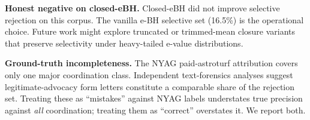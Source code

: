 \documentclass{article}
\theoremstyle{definition}
\theoremstyle{remark}
\begin{document}
\textbf{Honest negative on closed-eBH.} Closed-eBH did not improve selective rejection on this corpus. The vanilla e-BH selective set (16.5\%) is the operational choice. Future work might explore truncated or trimmed-mean closure variants that preserve selectivity under heavy-tailed e-value distributions.

\textbf{Ground-truth incompleteness.} The NYAG paid-astroturf attribution covers only one major coordination class. Independent text-forensics analyses suggest legitimate-advocacy form letters constitute a comparable share of the rejection set. Treating these as ``mistakes'' against NYAG labels understates true precision against \emph{all} coordination; treating them as ``correct'' overstates it. We report both.



\end{document}
